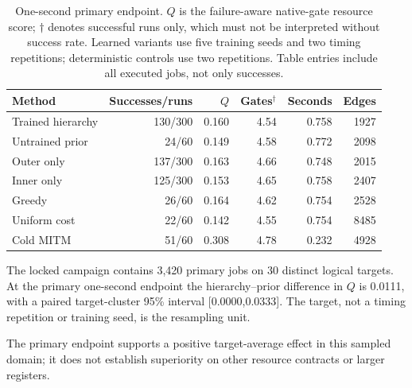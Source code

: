 \begin{table}[htbp]\centering\small

\begin{tabular}{lrrrrr}\toprule

Method & Successes/runs & $Q$ & Gates$^\dagger$ & Seconds & Edges \\ \midrule

Trained hierarchy & 130/300 & 0.160 & 4.54 & 0.758 & 1927 \\

Untrained prior & 24/60 & 0.149 & 4.58 & 0.772 & 2098 \\

Outer only & 137/300 & 0.163 & 4.66 & 0.748 & 2015 \\

Inner only & 125/300 & 0.153 & 4.65 & 0.758 & 2407 \\

Greedy & 26/60 & 0.164 & 4.62 & 0.754 & 2528 \\

Uniform cost & 22/60 & 0.142 & 4.55 & 0.754 & 8485 \\

Cold MITM & 51/60 & 0.308 & 4.78 & 0.232 & 4928 \\

\bottomrule\end{tabular}

\caption{One-second primary endpoint. $Q$ is the failure-aware native-gate resource score; $\dagger$ denotes successful runs only, which must not be interpreted without success rate. Learned variants use five training seeds and two timing repetitions; deterministic controls use two repetitions. Table entries include all executed jobs, not only successes.}\label{tab:primary}

\end{table}

The locked campaign contains 3,420 primary jobs on 30 distinct logical targets. At the primary one-second endpoint the hierarchy--prior difference in $Q$ is 0.0111, with a paired target-cluster 95\% interval [0.0000,0.0333]. The target, not a timing repetition or training seed, is the resampling unit.

The primary endpoint supports a positive target-average effect in this sampled domain; it does not establish superiority on other resource contracts or larger registers.

